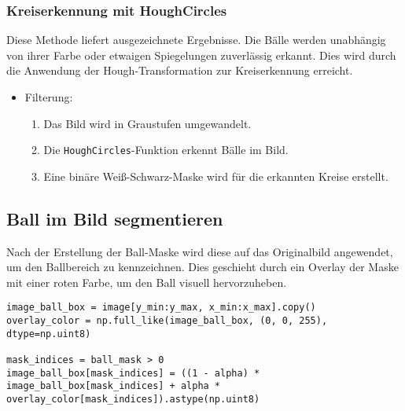 \newpage
\subsubsection{Kreiserkennung mit HoughCircles}

Diese Methode liefert ausgezeichnete Ergebnisse. Die Bälle werden unabhängig von ihrer Farbe oder etwaigen Spiegelungen zuverlässig erkannt. Dies wird durch die Anwendung der Hough-Transformation zur Kreiserkennung erreicht.

\begin{itemize}
    \item Filterung:
    \begin{enumerate}
        \item Das Bild wird in Graustufen umgewandelt.
        \item Die \texttt{HoughCircles}-Funktion erkennt Bälle im Bild.
        \item Eine binäre Weiß-Schwarz-Maske wird für die erkannten Kreise erstellt.
    \end{enumerate}
\end{itemize}

\begin{minipage}[t]{0.4\textwidth}
\end{minipage}
%
\begin{minipage}[t]{0.6\textwidth}
\end{minipage}

\newpage
\subsection{Ball im Bild segmentieren}

Nach der Erstellung der Ball-Maske wird diese auf das Originalbild angewendet, um den Ballbereich zu kennzeichnen. Dies geschieht durch ein Overlay der Maske mit einer roten Farbe, um den Ball visuell hervorzuheben.

\begin{verbatim}
image_ball_box = image[y_min:y_max, x_min:x_max].copy()
overlay_color = np.full_like(image_ball_box, (0, 0, 255), dtype=np.uint8)

mask_indices = ball_mask > 0
image_ball_box[mask_indices] = ((1 - alpha) * image_ball_box[mask_indices] + alpha * overlay_color[mask_indices]).astype(np.uint8)
\end{verbatim}

